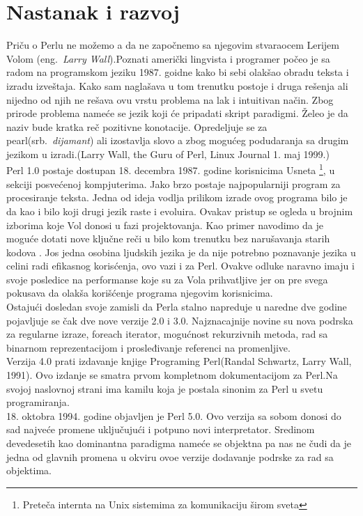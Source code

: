 \documentclass[12pt]{article}
\begin{document}
\section{Nastanak i razvoj}

Priču o Perlu ne možemo a da ne započnemo sa njegovim stvaraocem Lerijem Volom (eng.~{\em Larry Wall}).Poznati američki lingvista i programer počeo je sa radom na programskom jeziku 1987. goidne kako bi sebi olakšao obradu teksta i izradu izveštaja. Kako sam naglašava u tom trenutku postoje i druga rešenja ali nijedno od njih ne rešava ovu vrstu problema na lak i intuitivan način. Zbog prirode problema nameće se jezik koji će pripadati skript paradigmi. Želeo je da naziv bude kratka reč pozitivne konotacije. Opredeljuje se za pearl(srb.~{\em dijamant}) ali izostavlja slovo a zbog mogućeg podudaranja sa drugim jezikom u izradi.(Larry Wall, the Guru of Perl, Linux Journal 1. maj 1999.)\\
Perl 1.0 postaje dostupan 18. decembra 1987. godine korisnicima Usneta \footnote{Preteča internta na Unix sistemima za komunikaciju širom sveta}, u sekciji posvećenoj kompjuterima. Jako brzo postaje najpopularniji program za procesiranje teksta. Jedna od ideja vodlja prilikom izrade ovog programa bilo je da kao i bilo koji drugi jezik raste i evoluira. Ovakav pristup se ogleda u brojnim izborima koje Vol donosi u fazi projektovanja. Kao primer navodimo da je moguće  dotati nove ključne reči u bilo kom trenutku bez narušavanja starih kodova \cite{id}. Jos jedna osobina ljudskih jezika je da nije potrebno poznavanje jezika u celini radi efikasnog korisćenja, ovo vazi i za Perl.  Ovakve odluke naravno imaju i svoje posledice na performanse koje su za Vola prihvatljive jer on pre svega pokusava da olakša korišćenje programa njegovim korisnicima.\\
Ostajući dosledan svoje zamisli da Perla stalno napreduje u naredne dve godine pojavljuje se čak dve nove verzije 2.0 i 3.0. Najznacajnije novine su nova podrska za regularne izraze, foreach iterator, mogućnost rekurzivnih metoda, rad sa binarnom reprezentacijom i prosleđivanje referenci na promenljive\cite{patchnotes}.\\
Verzija 4.0 prati izdavanje knjige Programing Perl(Randal Schwartz, Larry Wall, 1991). Ovo izdanje se smatra prvom kompletnom dokumentacijom za Perl.Na svojoj naslovnoj strani ima kamilu koja je postala sinonim za Perl u svetu programiranja\cite{perlOrg}.\\
18. oktobra 1994. godine objavljen je Perl 5.0. Ovo verzija sa sobom donosi do sad najveće promene uključujući i potpuno novi interpretator. Sredinom devedesetih kao dominantna paradigma nameće se objektna pa nas ne čudi da je jedna od glavnih promena u okviru ovoe verzije dodavanje podrske za rad sa objektima.\\
\end{document}
